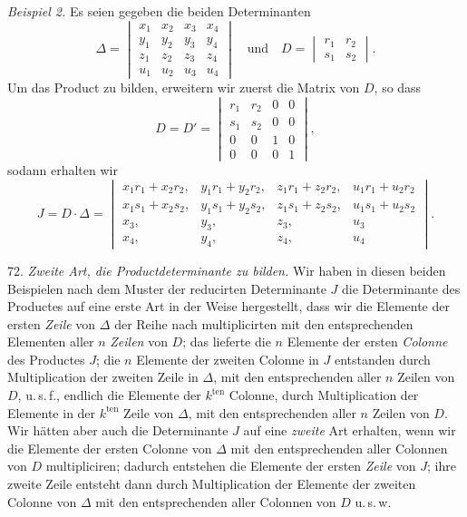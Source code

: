 \documentclass[11pt]{article}
\providecommand{\weberpage}[1]{}
\let\Delta\varDelta
\begin{document}
\textit{Beispiel 2.} Es seien gegeben die beiden Determinanten
\[
\Delta = \begin{vmatrix} x_1 & x_2 & x_3 & x_4 \\ y_1 & y_2 & y_3 & y_4 \\ z_1 & z_2 & z_3 & z_4 \\ u_1 & u_2 & u_3 & u_4 \end{vmatrix}
\quad \text{und} \quad
D = \begin{vmatrix} r_1 & r_2 \\ s_1 & s_2 \end{vmatrix}.
\]
Um das Product zu bilden, erweitern wir zuerst die Matrix von $D$, so
dass
\[
D = D' = \begin{vmatrix} r_1 & r_2 & 0 & 0 \\ s_1 & s_2 & 0 & 0 \\ 0 & 0 & 1 & 0 \\ 0 & 0 & 0 & 1 \end{vmatrix},
\]
sodann erhalten wir
\[
J = D \cdot \Delta =
\begin{vmatrix}
x_1 r_1 + x_2 r_2, & y_1 r_1 + y_2 r_2, & z_1 r_1 + z_2 r_2, & u_1 r_1 + u_2 r_2 \\
x_1 s_1 + x_2 s_2, & y_1 s_1 + y_2 s_2, & z_1 s_1 + z_2 s_2, & u_1 s_1 + u_2 s_2 \\
x_3, & y_3, & z_3, & u_3 \\
x_4, & y_4, & z_4, & u_4
\end{vmatrix}.
\]


\weberpage{77}

72. \textit{Zweite Art, die Productdeterminante zu bilden.} Wir haben in diesen beiden Beispielen nach dem Muster der reducirten Determinante $J$ die Determinante des Productes auf eine erste Art in der Weise hergestellt, dass wir die Elemente der ersten \textit{Zeile} von $\varDelta$ der Reihe nach multiplicirten mit den entsprechenden Elementen aller $n$ \textit{Zeilen} von $D$; das lieferte die $n$ Elemente der ersten \textit{Colonne} des Productes $J$; die $n$ Elemente der zweiten Colonne in $J$ entstanden durch Multiplication der zweiten Zeile in $\varDelta$, mit den entsprechenden aller $n$ Zeilen von $D$, u.\,s.\,f., endlich die Elemente der $k^{\mathrm{ten}}$ Colonne, durch Multiplication der Elemente in der $k^{\mathrm{ten}}$ Zeile von $\varDelta$, mit den entsprechenden aller $n$ Zeilen von $D$. Wir hätten aber auch die Determinante $J$ auf eine \textit{zweite} Art erhalten, wenn wir die Elemente der ersten Colonne von $\varDelta$ mit den entsprechenden aller Colonnen von $D$ multipliciren; dadurch entstehen die Elemente der ersten \textit{Zeile} von $J$; ihre zweite Zeile entsteht dann durch Multiplication der Elemente der zweiten Colonne von $\varDelta$ mit den entsprechenden aller Colonnen von $D$ u.\,s.\,w.
\end{document}
